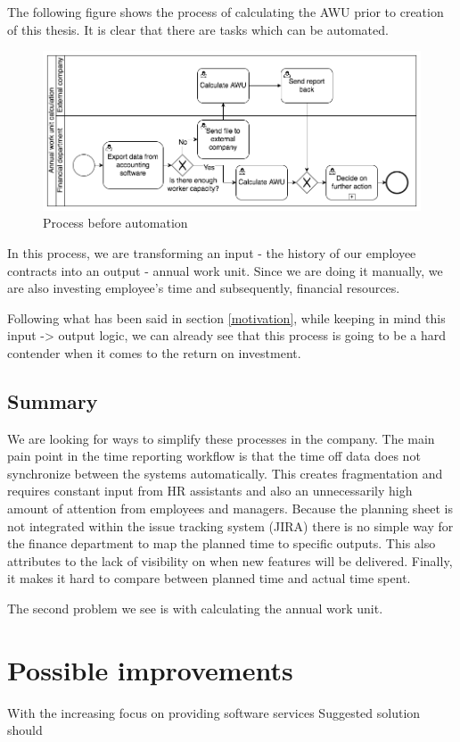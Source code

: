 \documentclass[12pt,oneside]{fithesis2}
\begin{document}
The following figure shows the process of calculating the AWU prior to creation of this thesis. It is clear that there are tasks which can be automated.
\begin{figure}[H]
    \centering
    \includegraphics[width=\textwidth]{before_automation.png}
    \caption{Process before automation}
    \label{fig:before_automation}
\end{figure}

In this process, we are transforming an input - the history of our employee contracts into an output - annual work unit. Since we are doing it manually, we are also investing employee's time and subsequently, financial resources. 

Following what has been said in section \ref{motivation}, while keeping in mind this input -> output logic, we can already see that this process is going to be a hard contender when it comes to the return on investment.

\section{Summary}
We are looking for ways to simplify these processes in the company. The main pain point in the time reporting workflow is that the time off data does not synchronize between the systems automatically. This creates fragmentation and requires constant input from HR assistants and also an unnecessarily high amount of attention from employees and managers. Because the planning sheet is not integrated within the issue tracking system (JIRA) there is no simple way for the finance department to map the planned time to specific outputs. This also attributes to the lack of visibility on when new features will be delivered. Finally, it makes it hard to compare between planned time and actual time spent.

The second problem we see is with calculating the annual work unit. 

\chapter{Possible improvements}
With the increasing focus on providing software services Suggested solution should 
\end{document}

